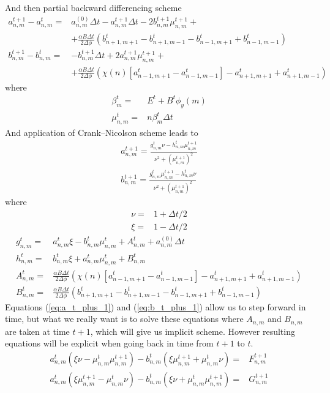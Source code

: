 \documentclass[40pt,letterpaper]{article}
\begin{document}
	And then partial backward differencing scheme
	\begin{align}	
	a^{t+1}_{n,m}-a^{t}_{n,m}=&a^{(0)}_{n,m}\Delta t-a^{t+1}_{n,m}\Delta t-
	2b^{t+1}_{n,m}\mu^{t+1}_{n,m}+\nonumber \\
	&+\frac{\alpha B\Delta t}{2\Delta\phi}(b^t_{n+1,m+1}-b^t_{n+1,m-1}-b^t_{n-1,m+1}+b^t_{n-1,m-1}) \label{eq:a_backward}\\
	b^{t+1}_{n,m}-b^{t}_{n,m}=&-b^{t+1}_{n,m}\Delta t+2a^{t+1}_{n,m}\mu^{t+1}_{n,m}+\nonumber \\
	&+\frac{\alpha B\Delta t}{2\Delta\phi}(\chi(n)[a^t_{n-1,m+1}-a^t_{n-1,m-1}]-a^t_{n+1,m+1}+a^t_{n+1,m-1}) \label{eq:b_backward}
	\end{align}
	where 
	\begin{align}
	\beta^t_m=&E^t+B^t\phi_y(m) \\
	\mu^t_{n,m}=&n\beta^t_{m}\Delta t
	\end{align}
	And application of Crank–Nicolson scheme leads to
	\begin{align}
	a^{t+1}_{n,m}=\frac{g^t_{n,m}\nu-h^t_{n,m}\mu^{t+1}_{n,m}}{\nu^2+\left(\mu^{t+1}_{n,m}\right)^2}\label{eq:a_t_plus_1}\\
	b^{t+1}_{n,m}=\frac{g^t_{n,m}\mu^{t+1}_{n,m}-h^t_{n,m}\nu}{\nu^2+\left(\mu^{t+1}_{n,m}\right)^2}\label{eq:b_t_plus_1}
	\end{align}
	where 
	\begin{align}
	\nu=&1+\Delta t/2 \\
	\xi=&1-\Delta t/2 
	\end{align}
	\begin{align}
	g^t_{n,m}=&a^t_{n,m}\xi-
		b^t_{n,m}\mu^t_{n,m}+A^t_{n,m}+a^{(0)}_{n,m}\Delta t \\
	h^t_{n,m}=&b^t_{n,m}\xi+a^t_{n,m}\mu^t_{n,m}+
		B^t_{n,m} \\
	A^t_{n,m}=&\frac{\alpha B\Delta t}{2\Delta\phi}(\chi(n)[a^t_{n-1,m+1}-a^t_{n-1,m-1}]-a^t_{n+1,m+1}+a^t_{n+1,m-1}) \\
	B^t_{n,m}=&\frac{\alpha B\Delta t}{2\Delta\phi}(b^t_{n+1,m+1}-b^t_{n+1,m-1}-
		b^t_{n-1,m+1}+b^t_{n-1,m-1})
	\end{align}
	Equations (\ref{eq:a_t_plus_1}) and (\ref{eq:b_t_plus_1}) allow us to step forward in time, but what we really want is to solve these 
	equations where $A_{n,m}$ and $B_{n,m}$ are taken at time $t+1$, which will give us implicit scheme. However resulting equations will be 
	explicit when going back in time from $t+1$ to $t$.
	\begin{align}
	 a^t_{n,m}(\xi\nu-\mu^t_{n,m}\mu^{t+1}_{n,m})-b^t_{n,m}(\xi\mu^{t+1}_{n,m}+\mu^t_{n,m}\nu)=&
	  F^{t+1}_{n,m} \\
	 a^t_{n,m}(\xi\mu^{t+1}_{n,m}-\mu^t_{n,m}\nu)-b^t_{n,m}(\xi\nu+\mu^t_{n,m}\mu^{t+1}_{n,m})=&
	  G^{t+1}_{n,m} 
	\end{align}
\end{document}
